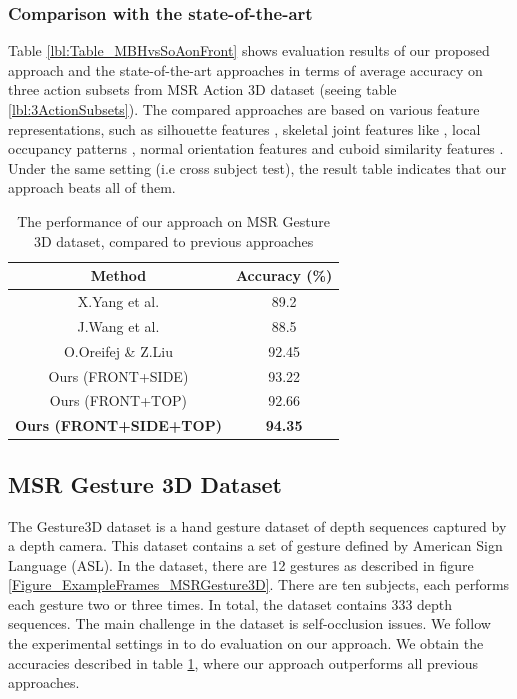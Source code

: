 \documentclass[final,3p,times,twocolumn]{elsarticle}
\begin{document}
\subsubsection{Comparison with the state-of-the-art}
Table \ref{lbl:Table_MBHvsSoAonFront} shows evaluation results of our proposed approach and the state-of-the-art approaches in terms of average accuracy on three action subsets from MSR Action 3D dataset (seeing table \ref{lbl:3ActionSubsets}).
The compared approaches are based on various feature representations, such as silhouette features \cite{li2010action, yang2012recognizing}, skeletal joint features like \cite{yang2012eigenjoints, wang2012mining}, local occupancy patterns \cite{wang2012robust, vieira2012stop}, normal orientation features \cite{oreifej2013hon4d} and cuboid similarity features \cite{xia2013spatio}.
Under the same setting (i.e cross subject test), the result table indicates that our approach beats all of them.

\begin{table}[H]
	\begin{tabular}{c|c}	
		    \bf Method & \bf Accuracy (\%) \\
		\hline
		X.Yang et al. \cite{yang2012recognizing}&       89.2 \\
		
		J.Wang et al. \cite{wang2012robust}&       88.5 \\
		
		O.Oreifej \& Z.Liu \cite{oreifej2013hon4d}&      92.45 \\
		\hline
		Ours (FRONT+SIDE) &      93.22 \\
		
		Ours (FRONT+TOP) &      92.66 \\
		
		\bf Ours (FRONT+SIDE+TOP) &      \bf 94.35 \\
	
	\end{tabular}  
	
	\caption{The performance of our approach on MSR Gesture 3D dataset, compared to previous approaches}
	\label{Table_MSRGesture3D_SoA}
\end{table}

\subsection{MSR Gesture 3D Dataset}

The Gesture3D dataset \cite{wang2012robust} is a hand gesture dataset of depth sequences captured by a depth camera.
This dataset contains a set of gesture defined by American Sign Language (ASL).
In the dataset, there are 12 gestures as described in figure \ref{Figure_ExampleFrames_MSRGesture3D}.
There are ten subjects, each performs each gesture two or three times.
In total, the dataset contains 333 depth sequences.
The main challenge in the dataset is self-occlusion issues.
We follow the experimental settings in \cite{wang2012robust} to do evaluation on our approach.
We obtain the accuracies described in table \ref{Table_MSRGesture3D_SoA}, where our approach outperforms all previous approaches.
\end{document}
